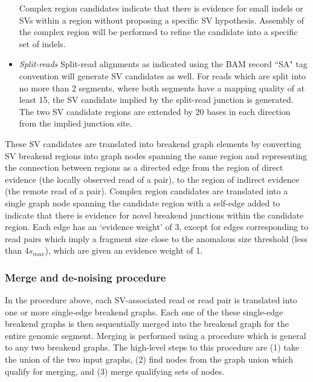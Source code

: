 \documentclass{article}
\begin{document}
\begin{itemize}
Complex region candidates indicate that there is evidence for small indels or SVs within a region without proposing a specific SV hypothesis. Assembly of the complex region will be performed to refine the candidate into a specific set of indels.

\item \textit{Split-reads} Split-read alignments as indicated using the BAM record ``SA" tag convention will generate SV candidates as well. For reads which are split into no more than 2 segments, where both segments have a mapping quality of at least 15, the SV candidate implied by the split-read junction is generated. The two SV candidate regions are extended by 20 bases in each direction from the implied junction site.

\end{itemize}

These SV candidates are translated into breakend graph elements by converting SV breakend regions into graph nodes spanning the same region and representing the connection between regions as a directed edge from the region of direct evidence (the locally observed read of a pair), to the region of indirect evidence (the remote read of a pair). Complex region candidates are translated into a single graph node spanning the candidate region with a self-edge added to indicate that there is evidence for novel breakend junctions within the candidate region. Each edge has an `evidence weight' of 3, except for edges corresponding to read pairs which imply a fragment size close to the anomalous size threshold (less than $4s_{max}$), which are given an evidence weight of 1.

\subsubsection{Merge and de-noising procedure}

In the procedure above, each SV-associated read or read pair is translated into one or more single-edge breakend graphs. Each one of the these single-edge breakend graphs is then sequentially merged into the breakend graph for the entire genomic segment. Merging is performed using a procedure which is general to any two breakend graphs. The high-level steps to this procedure are (1) take the union of the two input graphs, (2) find nodes from the graph union which qualify for merging, and (3) merge qualifying sets of nodes.
\end{document}
